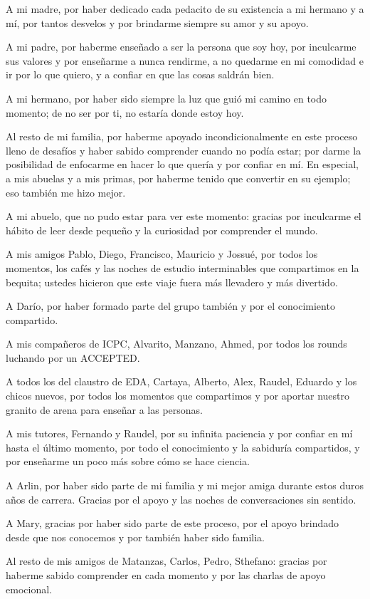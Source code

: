 \begin{acknowledgements}
    A mi madre, por haber dedicado cada pedacito de su existencia a mi
    hermano y a mí, por tantos desvelos y por brindarme siempre su amor y
    su apoyo.

    A mi padre, por haberme enseñado a ser la persona que soy hoy, por
    inculcarme sus valores y por enseñarme a nunca rendirme, a no quedarme
    en mi comodidad e ir por lo que quiero, y a confiar en que las cosas
    saldrán bien.

    A mi hermano, por haber sido siempre la luz que guió mi camino en todo
    momento; de no ser por ti, no estaría donde estoy hoy.

    Al resto de mi familia, por haberme apoyado incondicionalmente en este
    proceso lleno de desafíos y haber sabido comprender cuando no podía
    estar; por darme la posibilidad de enfocarme en hacer lo que quería y
    por confiar en mí. En especial, a mis abuelas y a mis primas, por
    haberme tenido que convertir en su ejemplo; eso también me hizo mejor.

    A mi abuelo, que no pudo estar para ver este momento: gracias por
    inculcarme el hábito de leer desde pequeño y la curiosidad por
    comprender el mundo.

    A mis amigos Pablo, Diego, Francisco, Mauricio y Jossué, por todos los
    momentos, los cafés y las noches de estudio interminables que
    compartimos en la bequita; ustedes hicieron que este viaje fuera más
    llevadero y más divertido.

    A Darío, por haber formado parte del grupo también y por el
    conocimiento compartido.

    A mis compañeros de ICPC, Alvarito, Manzano, Ahmed, por todos los
    rounds luchando por un ACCEPTED.

    A todos los del claustro de EDA, Cartaya, Alberto, Alex, Raudel,
    Eduardo y los chicos nuevos, por todos los momentos que compartimos y
    por aportar nuestro granito de arena para enseñar a las personas.

    A mis tutores, Fernando y Raudel, por su infinita paciencia y por
    confiar en mí hasta el último momento, por todo el conocimiento y la
    sabiduría compartidos, y por enseñarme un poco más sobre cómo se hace
    ciencia.

    A Arlin, por haber sido parte de mi familia y mi mejor amiga durante
    estos duros años de carrera. Gracias por el apoyo y las noches de
    conversaciones sin sentido.

    A Mary, gracias por haber sido parte de este proceso, por el apoyo
    brindado desde que nos conocemos y por también haber sido familia.

    Al resto de mis amigos de Matanzas, Carlos, Pedro, Sthefano: gracias
    por haberme sabido comprender en cada momento y por las charlas de
    apoyo emocional.
\end{acknowledgements}
